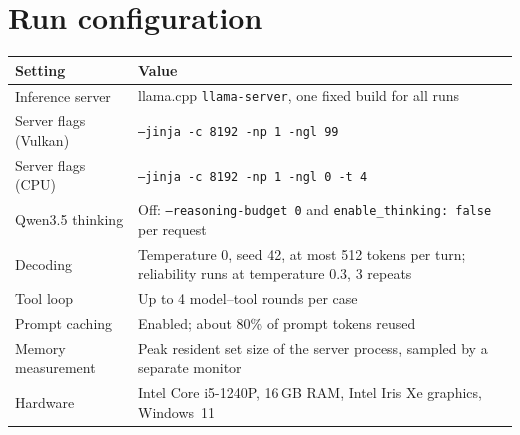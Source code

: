 \documentclass[11pt,a4paper]{article}
\begin{document}
\section{Run configuration}\label{app:config}
\begin{small}
\begin{tabularx}{\textwidth}{l L}
\toprule
Setting & Value \\
\midrule
Inference server & llama.cpp \texttt{llama-server}, one fixed build for all runs \\
Server flags (Vulkan) & \texttt{--jinja -c 8192 -np 1 -ngl 99} \\
Server flags (CPU) & \texttt{--jinja -c 8192 -np 1 -ngl 0 -t 4} \\
Qwen3.5 thinking & Off: \texttt{--reasoning-budget 0} and \texttt{enable\_thinking: false} per request \\
Decoding & Temperature 0, seed 42, at most 512 tokens per turn; reliability runs at temperature 0.3, 3 repeats \\
Tool loop & Up to 4 model--tool rounds per case \\
Prompt caching & Enabled; about 80\% of prompt tokens reused \\
Memory measurement & Peak resident set size of the server process, sampled by a separate monitor \\
Hardware & Intel Core i5-1240P, 16\,GB RAM, Intel Iris Xe graphics, Windows~11 \\
\bottomrule
\end{tabularx}
\end{small}
\end{document}
